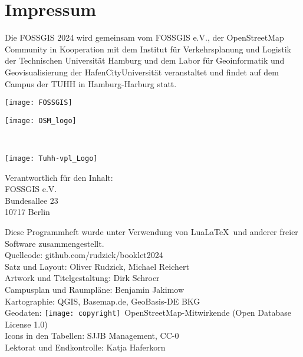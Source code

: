 \newpage
\vspace*{-4.5em}

\section*{Impressum}
\label{impressum}
\pagestyle{cropmarksstyle}

\RaggedRight
{\small
Die FOSSGIS 2024 wird gemeinsam vom FOSSGIS e.V.,  der OpenStreetMap Community
in Kooperation mit dem Institut für Verkehrsplanung und Logistik der Technischen Universität Hamburg
und dem Labor für Geoinformatik und Geovisualisierung der HafenCityUniversität veranstaltet und
findet auf dem Campus der TUHH in Hamburg-Harburg statt.

\vspace{0.5em}
\newlength\logoHeight
\setlength{\logoHeight}{4.0\baselineskip}
\begin{minipage}[c]{0.5\textwidth}
  \texttt{[image: FOSSGIS]}
\end{minipage}
\begin{minipage}[c]{0.45\textwidth}
  \texttt{[image: OSM\_logo]}
\end{minipage}\\
\begin{minipage}[l]{0.45\textwidth}
  \texttt{[image: Tuhh-vpl\_Logo]}
\end{minipage}
\begin{minipage}[r]{0.45\textwidth}
  
\end{minipage}

\vspace{0.5em}
\noindent Verantwortlich für den Inhalt:\\
FOSSGIS e.V.\\
Bundesallee 23\\
10717 Berlin

\vspace{0.5em}
\noindent Diese Programmheft wurde unter Verwendung von Lua\LaTeX\ und 
anderer freier Software zusammengestellt.\\
Quellcode: github.com/rudzick/booklet2024\\
\noindent Satz und Layout: Oliver Rudzick, Michael Reichert\\
Artwork und Titelgestaltung: Dirk Schroer\\
Campusplan und Raumpläne: Benjamin Jakimow\\
Kartographie: QGIS, Basemap.de, GeoBasis-DE BKG\\
Geodaten: \texttt{[image: copyright]}~Open\-Street\-Map-Mitwirkende (Open Database License 1.0)\\
Icons in den Tabellen: SJJB Management, CC-0\\
Lektorat und Endkontrolle: Katja Haferkorn

}
